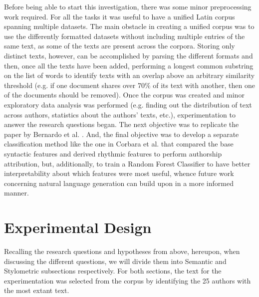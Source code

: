 \documentclass{csfourzero}
\begin{document}
Before being able to start this investigation, there was some minor preprocessing work required. For all the tasks it was useful to have a unified Latin corpus spanning multiple datasets. The main obstacle in creating a unified corpus was to use the differently formatted datasets without including multiple entries of the same text, as some of the texts are present across the corpora. Storing only distinct texts, however, can be accomplished by parsing the different formats and then, once all the texts have been added, performing a longest common substring on the list of words to identify texts with an overlap above an arbitrary similarity threshold (e.g. if one document shares over 70$\%$ of its text with another, then one of the documents should be removed). Once the corpus was created and minor exploratory data analysis was performed (e.g. finding out the distribution of text across authors, statistics about the authors' texts, etc.), experimentation to answer the research questions began. The next objective was to replicate the paper by Bernardo et al. \cite{https://doi.org/10.48550/arxiv.2109.00601}. And, the final objective was to develop a separate classification method like the one in Corbara et al. \cite{SyllabicQuantity} that compared the base syntactic features and derived rhythmic features to perform authorship attribution, but, additionally, to train a Random Forest Classifier to have better interpretability about which features were most useful, whence future work concerning natural language generation can build upon in a more informed manner. 


\section{Experimental Design}
\label{sec:exp}

Recalling the research questions and hypotheses from above, hereupon, when discussing the different questions, we will divide them into Semantic and Stylometric subsections respectively. For both sections, the text for the experimentation was selected from the corpus by identifying the 25 authors with the most extant text. 
\end{document}
